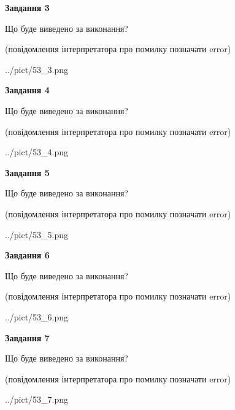 \documentclass[12pt, ukrainian]{article}
\begin{document}
{\begin {large}
{\begin {center}\textbf{Завдання 3}\end {center}}\par
Що буде виведено за виконання?\par
 (повідомлення інтерпретатора про помилку позначати error)\par
\begin{center}
	{../pict/53_3.png}
\end{center}
\newpage

{\begin {center}\textbf{Завдання 4}\end {center}}\par
Що буде виведено за виконання?\par
 (повідомлення інтерпретатора про помилку позначати error)\par
\begin{center}
	{../pict/53_4.png}
\end{center}
\newpage

{\begin {center}\textbf{Завдання 5}\end {center}}\par
Що буде виведено за виконання?\par
 (повідомлення інтерпретатора про помилку позначати error)\par
\begin{center}
	{../pict/53_5.png}
\end{center}
\newpage

{\begin {center}\textbf{Завдання 6}\end {center}}\par
Що буде виведено за виконання?\par
 (повідомлення інтерпретатора про помилку позначати error)\par
\begin{center}
	{../pict/53_6.png}
\end{center}
\newpage

{\begin {center}\textbf{Завдання 7}\end {center}}\par
Що буде виведено за виконання?\par
 (повідомлення інтерпретатора про помилку позначати error)\par
\begin{center}
	{../pict/53_7.png}
\end{center}
\newpage


\end{large}}
\end{document}
